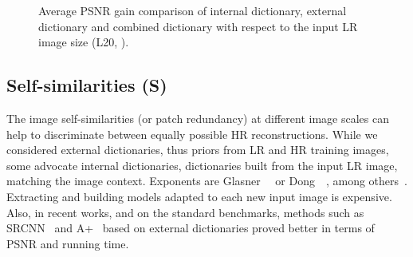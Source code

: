 \documentclass[10pt,twocolumn,letterpaper]{article}
\begin{document}
\begin{figure}[t!]
    \centering
{
  }
   \caption{Average PSNR gain comparison of internal dictionary, external dictionary and combined dictionary with respect to the input LR image size (L20, ).} 
    \label{fig:PSNR_vs_dictionary}
    \vspace{-0.5cm}
\end{figure}

\subsection{Self-similarities (S)}
\label{ssc:selfsimilarities}
The image self-similarities (or patch redundancy) at different image scales can help to discriminate between equally possible HR reconstructions.
While we considered external dictionaries, thus priors from LR and HR training images,
some advocate internal dictionaries, \ie dictionaries built from the input LR image, matching the image context. Exponents are Glasner~\etal~\cite{Glasner-ICCV-2009} or Dong~\etal~\cite{Dong-TIP-2013}, among others~\cite{Yang-ACCV-2010-short,Freedman-TG-2011,Yang-CVPR-2013,Huang-CVPR-2015}. Extracting and building models adapted to each new input image is expensive. Also, in recent works, and on the standard benchmarks, methods such as SRCNN~\cite{Dong-ECCV-2014} and A+~\cite{Timofte-ACCV-2014} based on external dictionaries proved better in terms of PSNR and running time.
\end{document}
